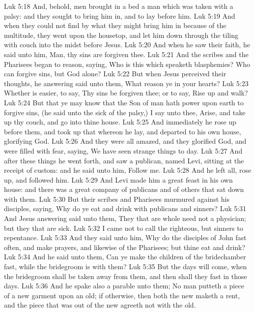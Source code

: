 \vs Luk 5:18 And, behold, men brought in a bed a man which was taken with a palsy: and they sought  to bring him in, and to lay  before him.
\vs Luk 5:19 And when they could not find by what  they might bring him in because of the multitude, they went upon the housetop, and let him down through the tiling with  couch into the midst before Jesus.
\vs Luk 5:20 And when he saw their faith, he said unto him, Man, thy sins are forgiven thee.
\vs Luk 5:21 And the scribes and the Pharisees began to reason, saying, Who is this which speaketh blasphemies? Who can forgive sins, but God alone?
\vs Luk 5:22 But when Jesus perceived their thoughts, he answering said unto them, What reason ye in your hearts?
\vs Luk 5:23 Whether is easier, to say, Thy sins be forgiven thee; or to say, Rise up and walk?
\vs Luk 5:24 But that ye may know that the Son of man hath power upon earth to forgive sins, (he said unto the sick of the palsy,) I say unto thee, Arise, and take up thy couch, and go into thine house.
\vs Luk 5:25 And immediately he rose up before them, and took up that whereon he lay, and departed to his own house, glorifying God.
\vs Luk 5:26 And they were all amazed, and they glorified God, and were filled with fear, saying, We have seen strange things to day.
\vs Luk 5:27 And after these things he went forth, and saw a publican, named Levi, sitting at the receipt of custom: and he said unto him, Follow me.
\vs Luk 5:28 And he left all, rose up, and followed him.
\vs Luk 5:29 And Levi made him a great feast in his own house: and there was a great company of publicans and of others that sat down with them.
\vs Luk 5:30 But their scribes and Pharisees murmured against his disciples, saying, Why do ye eat and drink with publicans and sinners?
\vs Luk 5:31 And Jesus answering said unto them, They that are whole need not a physician; but they that are sick.
\vs Luk 5:32 I came not to call the righteous, but sinners to repentance.
\vs Luk 5:33 And they said unto him, Why do the disciples of John fast often, and make prayers, and likewise  of the Pharisees; but thine eat and drink?
\vs Luk 5:34 And he said unto them, Can ye make the children of the bridechamber fast, while the bridegroom is with them?
\vs Luk 5:35 But the days will come, when the bridegroom shall be taken away from them, and then shall they fast in those days.
\vs Luk 5:36 And he spake also a parable unto them; No man putteth a piece of a new garment upon an old; if otherwise, then both the new maketh a rent, and the piece that was  out of the new agreeth not with the old.
